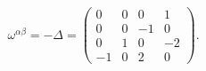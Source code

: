 \begin{equation}\omega^{\alpha\beta}= -\Delta= \left(
 \begin{array}{cccc}
 0&0&0&1 \\0&0&-1&0 \\0&1&0&-2 \\ -1&0&2&0
 \end{array}\right).
 \label{a64}
 \end{equation}

